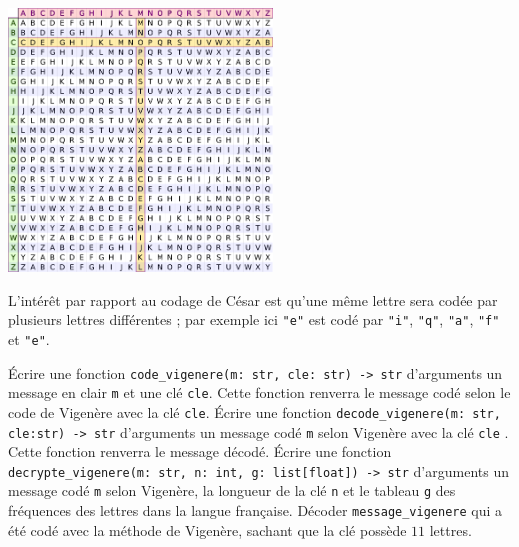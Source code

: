 \documentclass{magnolia}
\begin{document}
\begin{center}\includegraphics[width=7cm]{../../Commun/Images/python-tps-vigenere2.png}\end{center}

L'intérêt par rapport au codage de César est qu'une même lettre sera codée par
plusieurs lettres différentes ; par exemple ici \verb_"e"_ est codé par \verb_"i"_,
\verb_"q"_, \verb_"a"_, \verb_"f"_ et \verb_"e"_.

\begin{questions}
\question Écrire une fonction \verb!code_vigenere(m: str, cle: str) -> str! d'arguments
un message en clair \verb_m_ et une clé \verb_cle_. Cette fonction renverra le message
codé selon le code de Vigenère avec la clé \verb_cle_.
\question Écrire une fonction \verb!decode_vigenere(m: str, cle:str) -> str! d'arguments
un message codé \verb_m_ selon Vigenère avec la clé \verb_cle_ . Cette
fonction renverra le message décodé.
\question Écrire une fonction \verb!decrypte_vigenere(m: str, n: int, g: list[float]) -> str! d'arguments un message codé \verb_m_ selon Vigenère, la longueur de la clé
\verb_n_ et le tableau \verb_g_ des fréquences des lettres dans la langue française. 
\question Décoder \verb!message_vigenere! qui a été codé avec la méthode de
  Vigenère, sachant que la clé possède $11$ lettres.
\end{questions}

\end{document}
